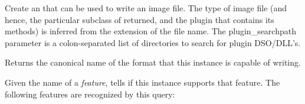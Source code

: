 
Create an \ImageOutput that can be used to write an image file.  The
type of image file (and hence, the particular subclass of \ImageOutput
returned, and the plugin that contains its methods) is inferred from the
extension of the file name.  The {\kw plugin_searchpath} parameter is a
colon-separated list of directories to search for \product plugin
DSO/DLL's.

\apiend

Returns the canonical name of the format that this \ImageOutput
instance is capable of writing.
\apiend

\label{sec:supportsfeaturelist}
Given the name of a \emph{feature}, tells if this \ImageOutput 
instance supports that feature.  The following features are recognized
by this query:
